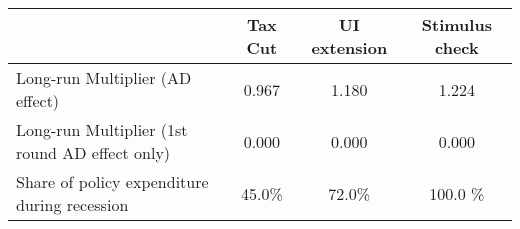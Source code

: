 \begin{tabular}{@{}lccc@{}} 
\toprule 
& Tax Cut    & UI extension    & Stimulus check    \\  \midrule 
Long-run Multiplier (AD effect) &0.967  & 1.180  & 1.224     \\ 
Long-run Multiplier (1st round AD effect only) &0.000  & 0.000  & 0.000     \\ 
Share of policy expenditure during recession &45.0\%  & 72.0\%  & 100.0 \%    \\ 
\end{tabular}  
